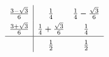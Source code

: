 \begin{gather*}
  \def\arraystretch{1.5}
  \begin{array}{c|cc}  
    \frac{3-\sqrt3}{6} & \frac14 & \frac14-\frac{\sqrt3}{6}
    \\
    \frac{3+\sqrt3}{6} & \frac14+\frac{\sqrt3}{6} & \frac14
    \\\hline
                       & \frac12 & \frac12
  \end{array}
\end{gather*}

